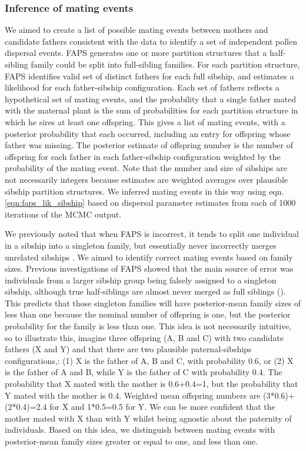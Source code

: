 \documentclass[10pt, a4paper, twocolumn]{article} %
\begin{document}
\subsubsection{Inference of mating events}

We aimed to create a list of possible mating events between mothers and candidate fathers consistent with the data to identify a set of independent pollen dispersal events.
FAPS generates one or more partition structures that a half-sibling family could be split into full-sibling families.
For each partition structure, FAPS identifies valid set of distinct fathers for each full sibship, and estimates a likelihood for each father-sibship configuration.
Each set of fathers reflects a hypothetical set of mating events, and the probability that a single father mated with the maternal plant is the sum of probabilities for each partition structure in which he sires at least one offspring.
This gives a list of mating events, with a posterior probability that each occurred, including an entry for offspring whose father was missing.
The posterior estimate of offspring number is the number of offspring for each father in each father-sibship configuration weighted by the probability of the mating event.
Note that the number and size of sibships are not necessarily integers because estimates are weighted averages over plausible sibship partition structures.
We inferred mating events in this way using eqn. \ref{eqn:faps_lik_sibship} based on dispersal parameter estimates from each of 1000 iterations of the MCMC output.

We previously noted that when FAPS is incorrect, it tends to split one individual in a sibship into a singleton family, but essentially never incorrectly merges unrelated sibships \cite{ellis2018efficient}.
We aimed to identify correct mating events based on family sizes.
Previous investigations of FAPS showed that the main source of error was individuals from a larger sibship group being falsely assigned to a singleton sibship, although true half-siblings are almost never merged as full siblings (\cite{ellis2018efficient}).
This predicts that those singleton families will have posterior-mean family sizes of less than one because the nominal number of offspring is one, but the posterior probability for the family is less than one.
This idea is not necessarily intuitive, so to illustrate this, imagine three offspring (A, B and C) with two candidate fathers (X and Y) and that there are two plausible paternal-sibships configurations,: (1) X is the father of A, B and C, with probability 0.6, or (2) X is the father of A and B, while Y is the father of C with probability 0.4.
The probability that X mated with the mother is 0.6+0.4=1, but the probability that Y mated with the mother is 0.4.
Weighted mean offspring numbers are (3*0.6)+(2*0.4)=2.4 for X and 1*0.5=0.5 for Y.
We can be more confident that the mother mated with X than with Y whilst being agnostic about the paternity of individuals.
Based on this idea, we distinguish between mating events with posterior-mean family sizes greater or equal to one, and less than one.
\end{document}
